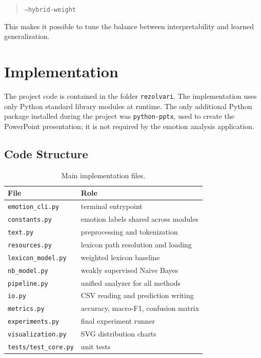 \documentclass[11pt]{article}
\begin{document}
\begin{quote}
\texttt{--hybrid-weight}
\end{quote}

This makes it possible to tune the balance between interpretability and learned generalization.

\section{Implementation}

The project code is contained in the folder \texttt{rezolvari}. The implementation uses only Python standard library modules at runtime. The only additional Python package installed during the project was \texttt{python-pptx}, used to create the PowerPoint presentation; it is not required by the emotion analysis application.

\subsection{Code Structure}

\begin{table}[h]
\centering
\small
\begin{tabular}{ll}
\toprule
\textbf{File} & \textbf{Role} \\
\midrule
\texttt{emotion\_cli.py} & terminal entrypoint \\
\texttt{constants.py} & emotion labels shared across modules \\
\texttt{text.py} & preprocessing and tokenization \\
\texttt{resources.py} & lexicon path resolution and loading \\
\texttt{lexicon\_model.py} & weighted lexicon baseline \\
\texttt{nb\_model.py} & weakly supervised Naive Bayes \\
\texttt{pipeline.py} & unified analyzer for all methods \\
\texttt{io.py} & CSV reading and prediction writing \\
\texttt{metrics.py} & accuracy, macro-F1, confusion matrix \\
\texttt{experiments.py} & final experiment runner \\
\texttt{visualization.py} & SVG distribution charts \\
\texttt{tests/test\_core.py} & unit tests \\
\bottomrule
\end{tabular}
\caption{Main implementation files.}
\label{tab:files}
\end{table}
\end{document}
